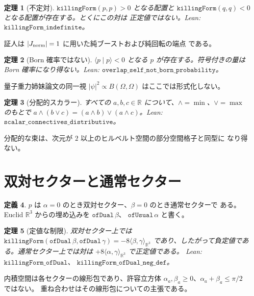 \documentclass[dvipdfmx,11pt,a4paper]{jsarticle}
\newtheorem{theorem}{定理}[section]
\theoremstyle{definition}
\newtheorem{definition}[theorem]{定義}
\theoremstyle{remark}
\newcommand{\Jnorm}{J_{\rm norm}}
\begin{document}
\begin{theorem}[不定対]
\label{thm:indef}
$\texttt{killingForm}(p,p)>0$ となる配置と
$\texttt{killingForm}(q,q)<0$ となる配置が存在する。とくにこの対は
正定値ではない。Lean: $\texttt{killingForm\_indefinite}$。
\end{theorem}

証人は $\lvert\Jnorm\rvert=1$ に用いた純ブーストおよび純回転の端点
である。

\begin{theorem}[Born 確率ではない]
\label{thm:born}
$\langle p\mid p\rangle<0$ となる $p$ が存在する。符号付きの量は
Born 確率になり得ない。Lean:
$\texttt{overlap\_self\_not\_born\_probability}$。
\end{theorem}

量子重力姉妹論文の同一視 $\lvert\psi\rvert^2\propto B(\Omega,\Omega)$
はここでは形式化しない。

\begin{theorem}[分配的スカラー]
\label{thm:dist}
すべての $a,b,c\in\mathbb{R}$ について、$\wedge=\min$、$\vee=\max$
のもとで $a\wedge(b\vee c)=(a\wedge b)\vee(a\wedge c)$。Lean:
$\texttt{scalar\_connectives\_distributive}$。
\end{theorem}

分配的な束は、次元が $2$ 以上のヒルベルト空間の部分空間格子と同型に
なり得ない。

\section{双対セクターと通常セクター}
\label{sec:sector}

\begin{definition}
$p$ は $\alpha=0$ のとき双対セクター、$\beta=0$ のとき通常セクターで
ある。Euclid $\mathbb{R}^3$ からの埋め込みを $\texttt{ofDual}\,\beta$、
$\texttt{ofUsual}\,\alpha$ と書く。
\end{definition}

\begin{theorem}[定値な制限]
\label{thm:sector}
双対セクター上では
$\texttt{killingForm}(\texttt{ofDual}\,\beta,\texttt{ofDual}\,\gamma)
=-8\langle\beta,\gamma\rangle_{\mathbb{R}^3}$
であり、したがって負定値である。通常セクター上では対は
$+8\langle\alpha,\gamma\rangle_{\mathbb{R}^3}$ で正定値である。
Lean: $\texttt{killingForm\_ofDual}$、
$\texttt{killingForm\_ofDual\_neg\_def}$。
\end{theorem}

内積空間は各セクターの線形包であり、許容立方体
$\alpha_a,\beta_a\ge 0$、$\alpha_a+\beta_a\le\pi/2$ ではない。
重ね合わせはその線形包についての主張である。
\end{document}
